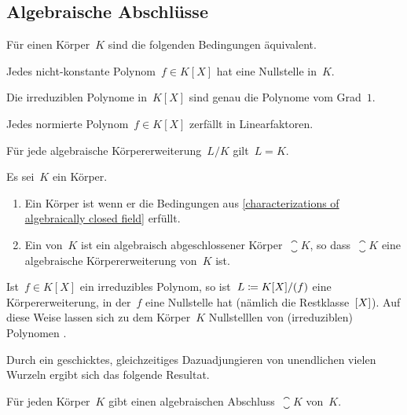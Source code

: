 \subsection{Algebraische Abschlüsse}

\begin{proposition}
  \label{characterizations of algebraically closed field}
  Für einen Körper~$K$ sind die folgenden Bedingungen äquivalent.
  \begin{equivlist}
    \item
      Jedes nicht-konstante Polynom~$f \in K[X]$ hat eine Nullstelle in~$K$.
    \item
      Die irreduziblen Polynome in~$K[X]$ sind genau die Polynome vom Grad~$1$.
    \item
      Jedes normierte Polynom~$f \in K[X]$ zerfällt in Linearfaktoren.
    \item
      Für jede algebraische Körpererweiterung~$L/K$ gilt~$L = K$.
  \end{equivlist}
\end{proposition}

\begin{definition}
  Es sei~$K$ ein Körper.
  \begin{enumerate}
    \item
      Ein Körper ist  wenn er die Bedingungen aus \cref{characterizations of algebraically closed field} erfüllt.
    \item
      Ein  von~$K$ ist ein algebraisch abgeschlossener Körper~$\closure{K}$, so dass~$\closure{K}$ eine algebraische Körpererweiterung von~$K$ ist.
  \end{enumerate}
\end{definition}

Ist~$f \in K[X]$ ein irreduzibles Polynom, so ist~$L \coloneqq K[X]/(f)$ eine Körpererweiterung, in der~$f$ eine Nullstelle hat (nämlich die Restklasse~$[X]$).
Auf diese Weise lassen sich zu dem Körper~$K$ Nullstelllen von (irreduziblen) Polynomen .

Durch ein geschicktes, gleichzeitiges Dazuadjungieren von unendlichen vielen Wurzeln ergibt sich das folgende Resultat.

\begin{theorem}[Steinitz]
  Für jeden Körper~$K$ gibt einen algebraischen Abschluss~$\closure{K}$ von~$K$.
\end{theorem}





